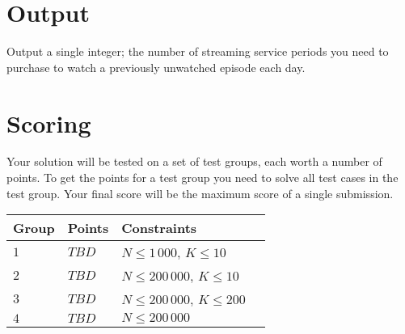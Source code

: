 \section*{Output}
Output a single integer; the number of streaming service periods you need to purchase to watch a previously unwatched episode each day.

\section*{Scoring}
Your solution will be tested on a set of test groups, each worth a number of points.
To get the points for a test group you need to solve all test cases in the test group.
Your final score will be the maximum score of a single submission.

\noindent
\begin{tabular}{| l | l | l | l |}
\hline
Group & Points & Constraints \\ \hline
$1$    & $TBD$         & $N \le 1\,000$, $K \le 10$ \\ \hline
$2$    & $TBD$         & $N \le 200\,000$, $K \le 10$ \\ \hline
$3$    & $TBD$         & $N \le 200\,000$, $K \le 200$ \\ \hline
$4$    & $TBD$         & $N \le 200\,000$ \\ \hline
\end{tabular}
